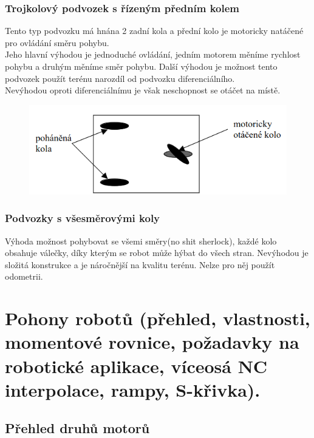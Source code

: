 \subsubsection{Trojkolový podvozek s řízeným předním kolem}
Tento typ podvozku má hnána 2 zadní kola a přední kolo je motoricky natáčené pro ovládání směru pohybu. \\
Jeho hlavní výhodou je jednoduché ovládání, jedním motorem měníme rychlost pohybu a druhým měníme směr pohybu. Další výhodou je možnost tento podvozek použít terénu narozdíl od podvozku diferenciálního.\\
Nevýhodou oproti diferenciálnímu je však neschopnost se otáčet na místě.\\
\begin{figure}[h!]
    \centering
    \includegraphics[scale = 0.5]{img/trojkol.png}
\end{figure}
\subsubsection{Podvozky s všesměrovými koly}
Výhoda možnost pohybovat se všemi směry(no shit sherlock), každé kolo obsahuje válečky, díky kterým se robot může hýbat do všech stran. Nevýhodou je složitá konstrukce a je náročnější na kvalitu terénu. Nelze pro něj použít odometrii. \\


\section{Pohony robotů (přehled, vlastnosti, momentové rovnice, požadavky na robotické aplikace, víceosá NC interpolace, rampy, S-křivka).}

\subsection{Přehled druhů motorů}
